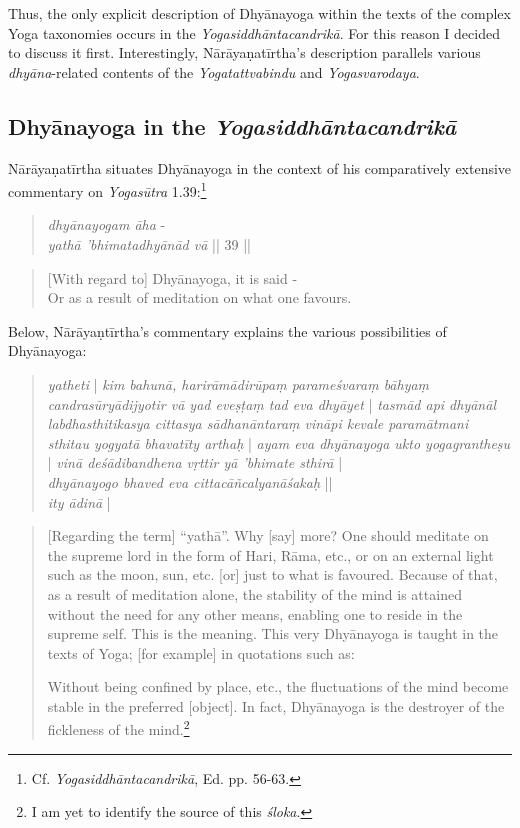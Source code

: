 Thus, the only explicit description of Dhyānayoga within the texts of the complex Yoga taxonomies occurs in the \textit{Yogasiddhāntacandrikā}. For this reason I decided to discuss it first. Interestingly, Nārāyaṇatīrtha's description parallels various \textit{dhyāna}-related contents of the \textit{Yogatattvabindu} and \textit{Yogasvarodaya}.      

\subsection{Dhyānayoga in the \textit{Yogasiddhāntacandrikā}}

Nārāyaṇatīrtha situates Dhyānayoga in the context of his comparatively extensive commentary on \textit{Yogasūtra} 1.39:\footnote{Cf. \emph{Yogasiddhāntacandrikā}, Ed. pp. 56-63.}

\begin{quote}
\textit{dhyānayogam āha} - \\
\textit{yathā 'bhimatadhyānād vā} || 39 ||
\end{quote}
\begin{quote}
[With regard to] Dhyānayoga, it is said - \\
 Or as a result of meditation on what one favours.
\end{quote}

Below, Nārāyaṇtīrtha's commentary explains the various possibilities of Dhyānayoga: 

\begin{quote}
  \textit{yatheti} | \textit{kim bahunā, harirāmādirūpaṃ parameśvaraṃ bāhyaṃ candrasūryādijyotir vā yad eveṣṭaṃ tad eva dhyāyet} | \textit{tasmād api dhyānāl labdhasthitikasya cittasya sādhanāntaraṃ vināpi kevale paramātmani sthitau yogyatā bhavatīty arthaḥ} | \textit{ayam eva dhyānayoga ukto yogagrantheṣu} |  
  \textit{vinā deśādibandhena vṛttir yā 'bhimate sthirā} |\\
  \textit{dhyānayogo bhaved eva cittacāñcalyanāśakaḥ} ||\\
    \textit{ity ādinā} | 
\end{quote}

\begin{quote}
  [Regarding the term] ``yathā''. Why [say] more? One should meditate on the supreme lord in the form of Hari, Rāma, etc., or on an external light such as the moon, sun, etc. [or] just to what is favoured. Because of that, as a result of meditation alone, the stability of the mind is attained without the need for any other means, enabling one to reside in the supreme self. This is the meaning. This very Dhyānayoga is taught in the texts of Yoga; [for example] in quotations such as: 

  Without being confined by place, etc., the fluctuations of the mind become stable in the preferred [object]. In fact, Dhyānayoga is the destroyer of the fickleness of the mind.\footnote{I am yet to identify the source of this \textit{śloka}.}\\
  
\end{quote}

